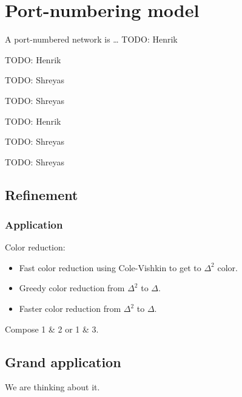 \chapter{Port-numbering model}

\begin{definition}
    \label{def:pn-network}
    A port-numbered network is \ldots
    TODO: Henrik
\end{definition}

\begin{definition}[PN model]
    \label{def:pn-model}
    TODO: Henrik
\end{definition}

\begin{definition}
    \label{def:local-model}
    TODO: Shreyas
\end{definition}

\begin{lemma}
    \label{lem:pn_is_local}
    TODO: Shreyas
\end{lemma}

\begin{definition}
    \label{def:covering-map}
    TODO: Henrik
\end{definition}

\begin{definition}
    \label{def:topology-view}
    TODO: Shreyas
\end{definition}

\begin{definition}
    \label{def:state-view}
    TODO: Shreyas
\end{definition}

\section{Refinement}

\begin{definition}[Refinement of PN]
    \label{def:pn-refinement}
\end{definition}

\begin{definition}
    \label{def:local-refinement}
\end{definition}

\subsection{Application}
Color reduction:
\begin{itemize}
    \item Fast color reduction using Cole-Vishkin to get to $\Delta^2$ color.
    \item Greedy color reduction from $\Delta^2$ to $\Delta$.
    \item Faster color reduction from $\Delta^2$ to $\Delta$.
\end{itemize}

Compose 1 \& 2 or 1 \& 3.

\section{Grand application}
We are thinking about it.
